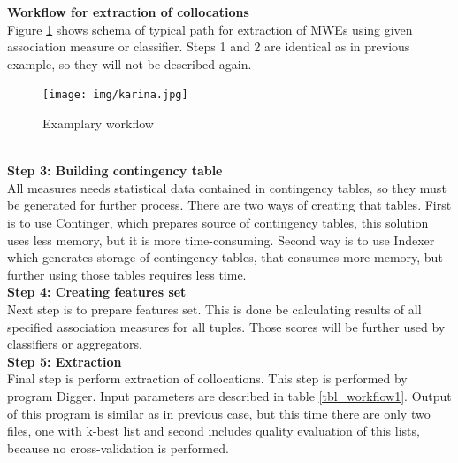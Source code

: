 \noindent \textbf{Workflow for extraction of collocations}
\\ Figure \ref{img_workflow2} shows schema of typical path for extraction of MWEs using given association measure or classifier.
Steps 1 and 2 are identical as in previous example, so they will not be described again.
\begin{figure}[ht]
	\centering
	\texttt{[image: img/karina.jpg]}
	\caption{Examplary workflow}
	\label{img_workflow2}
\end{figure}
\\ \textbf{Step 3: Building contingency table}\\
All measures needs statistical data contained in contingency tables, so they must be generated for further process. 
There are two ways of creating that tables. First is to use Continger, which prepares source of contingency tables, 
this solution uses less memory, but it is more time-consuming. Second way is to use Indexer which generates storage of contingency tables, 
that consumes more memory, but further using those tables requires less time.
\\ \textbf{Step 4: Creating features set}\\
Next step is to prepare features set. This is done be calculating results of all specified association measures for all tuples. 
Those scores will be further used by classifiers or aggregators.
\\ \textbf{Step 5: Extraction}\\
Final step is perform extraction of collocations. This step is performed by program Digger. Input parameters are described 
in table \ref{tbl_workflow1}. Output of this program is similar as in previous case, but this time there are only two files, 
one with k-best list and second includes quality evaluation of this lists, because no cross-validation is performed.

